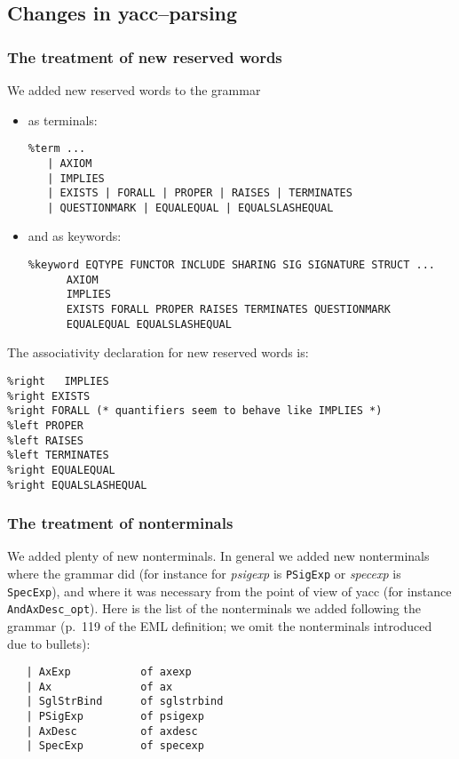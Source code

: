 \subsection{Changes in yacc--parsing}
\label{sec:yacc}


\subsubsection{The treatment of new reserved words}

We added new reserved words to the grammar
\begin{itemize}
\item as terminals:
{\small
\begin{verbatim}
%term ...
   | AXIOM
   | IMPLIES
   | EXISTS | FORALL | PROPER | RAISES | TERMINATES
   | QUESTIONMARK | EQUALEQUAL | EQUALSLASHEQUAL
\end{verbatim}}
\item and as keywords:
{\small
\begin{verbatim}
%keyword EQTYPE FUNCTOR INCLUDE SHARING SIG SIGNATURE STRUCT ...
      AXIOM
      IMPLIES
      EXISTS FORALL PROPER RAISES TERMINATES QUESTIONMARK
      EQUALEQUAL EQUALSLASHEQUAL 
\end{verbatim}}
\end{itemize}

\noindent The associativity declaration for new reserved words is: {\small
\begin{verbatim}
%right   IMPLIES
%right EXISTS 
%right FORALL (* quantifiers seem to behave like IMPLIES *)
%left PROPER
%left RAISES 
%left TERMINATES
%right EQUALEQUAL
%right EQUALSLASHEQUAL
\end{verbatim}}


\subsubsection{The treatment of nonterminals}

We added plenty of new nonterminals. In general we added new
nonterminals where the grammar did (for instance for {\it psigexp} is
{\tt PSigExp} or {\it specexp} is {\tt SpecExp}), and where it was
necessary from the point of view of yacc (for instance {\tt
  AndAxDesc\_opt}). Here is the list of the nonterminals we added
following the grammar (p.~119 of the EML definition; we omit
the nonterminals introduced due to bullets):
{\small
\begin{verbatim}
   | AxExp           of axexp
   | Ax              of ax
   | SglStrBind      of sglstrbind
   | PSigExp         of psigexp
   | AxDesc          of axdesc
   | SpecExp         of specexp
\end{verbatim}}

